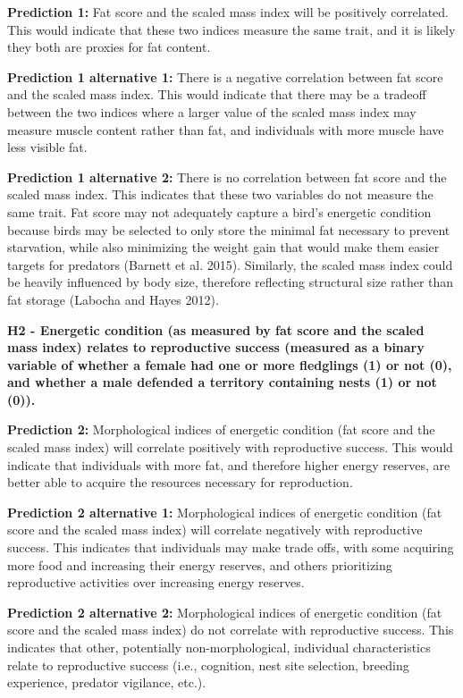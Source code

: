 \documentclass[
]{article}
\begin{document}
\textbf{Prediction 1:} Fat score and the scaled mass index will be
positively correlated. This would indicate that these two indices
measure the same trait, and it is likely they both are proxies for fat
content.

\textbf{Prediction 1 alternative 1:} There is a negative correlation
between fat score and the scaled mass index. This would indicate that
there may be a tradeoff between the two indices where a larger value of
the scaled mass index may measure muscle content rather than fat, and
individuals with more muscle have less visible fat.

\textbf{Prediction 1 alternative 2:} There is no correlation between fat
score and the scaled mass index. This indicates that these two variables
do not measure the same trait. Fat score may not adequately capture a
bird's energetic condition because birds may be selected to only store
the minimal fat necessary to prevent starvation, while also minimizing
the weight gain that would make them easier targets for predators
(Barnett et al. 2015). Similarly, the scaled mass index could be heavily
influenced by body size, therefore reflecting structural size rather
than fat storage (Labocha and Hayes 2012).

\textbf{H2 - Energetic condition (as measured by fat score and the
scaled mass index) relates to reproductive success (measured as a binary
variable of whether a female had one or more fledglings (1) or not (0),
and whether a male defended a territory containing nests (1) or not
(0)).}

\textbf{Prediction 2:} Morphological indices of energetic condition (fat
score and the scaled mass index) will correlate positively with
reproductive success. This would indicate that individuals with more
fat, and therefore higher energy reserves, are better able to acquire
the resources necessary for reproduction.

\textbf{Prediction 2 alternative 1:} Morphological indices of energetic
condition (fat score and the scaled mass index) will correlate
negatively with reproductive success. This indicates that individuals
may make trade offs, with some acquiring more food and increasing their
energy reserves, and others prioritizing reproductive activities over
increasing energy reserves.

\textbf{Prediction 2 alternative 2:} Morphological indices of energetic
condition (fat score and the scaled mass index) do not correlate with
reproductive success. This indicates that other, potentially
non-morphological, individual characteristics relate to reproductive
success (i.e., cognition, nest site selection, breeding experience,
predator vigilance, etc.).
\end{document}
